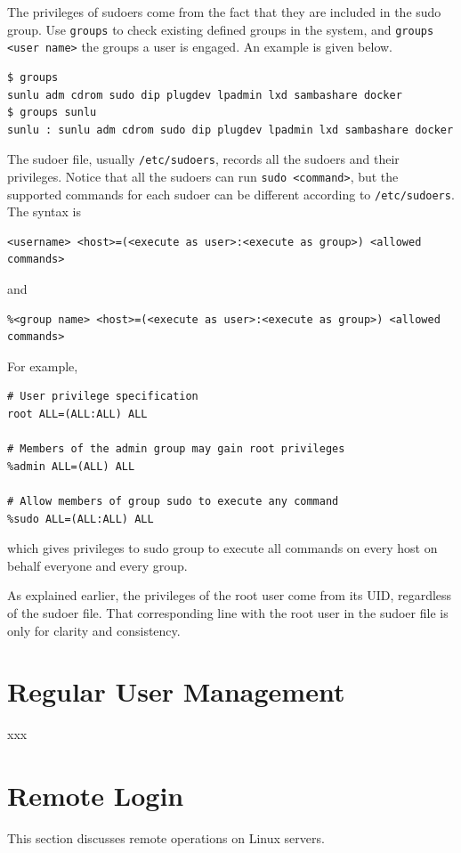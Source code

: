 The privileges of sudoers come from the fact that they are included in the sudo group. Use \verb|groups| to check existing defined groups in the system, and \verb|groups <user name>| the groups a user is engaged. An example is given below.
\begin{lstlisting}
$ groups
sunlu adm cdrom sudo dip plugdev lpadmin lxd sambashare docker
$ groups sunlu
sunlu : sunlu adm cdrom sudo dip plugdev lpadmin lxd sambashare docker
\end{lstlisting}

The sudoer file, usually \verb|/etc/sudoers|, records all the sudoers and their privileges. Notice that all the sudoers can run \verb|sudo <command>|, but the supported commands for each sudoer can be different according to \verb|/etc/sudoers|. The syntax is
\begin{lstlisting}
<username> <host>=(<execute as user>:<execute as group>) <allowed commands>
\end{lstlisting}
and
\begin{lstlisting}
%<group name> <host>=(<execute as user>:<execute as group>) <allowed commands>
\end{lstlisting}

For example,
\begin{lstlisting}
# User privilege specification
root ALL=(ALL:ALL) ALL

# Members of the admin group may gain root privileges
%admin ALL=(ALL) ALL

# Allow members of group sudo to execute any command
%sudo ALL=(ALL:ALL) ALL
\end{lstlisting}
which gives privileges to sudo group to execute all commands on every host on behalf everyone and every group.

As explained earlier, the privileges of the root user come from its UID, regardless of the sudoer file. That corresponding line with the root user in the sudoer file is only for clarity and consistency.

\section{Regular User Management}

xxx

\section{Remote Login}

This section discusses remote operations on Linux servers.

